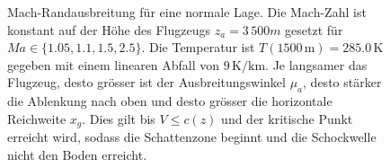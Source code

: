 \begin{figure}
    \centering
{}
    \caption{Mach-Randausbreitung für eine normale Lage. Die Mach-Zahl
    ist konstant auf der Höhe des Flugzeugs $z_a=3\,500 m$ gesetzt für
    $\textit{Ma} \in \{1.05, 1.1, 1.5, 2.5 \}$.
    Die Temperatur ist $T(1500\,\mathrm{m}) = 285.0\,\mathrm{K}$ gegeben mit einem
    linearen Abfall von $9\,\mathrm{K/km}$.
    Je langsamer das Flugzeug, desto grösser ist der Ausbreitungswinkel
    $\mu_a$, desto stärker die Ablenkung nach oben und desto grösser
    die horizontale Reichweite $x_g$.
    Dies gilt bis $V\le c(z)$ und der kritische Punkt erreicht wird,
    sodass die Schattenzone beginnt und die Schockwelle nicht den
    Boden erreicht.}
    \label{fig:schall:norm-lage}
\end{figure}

